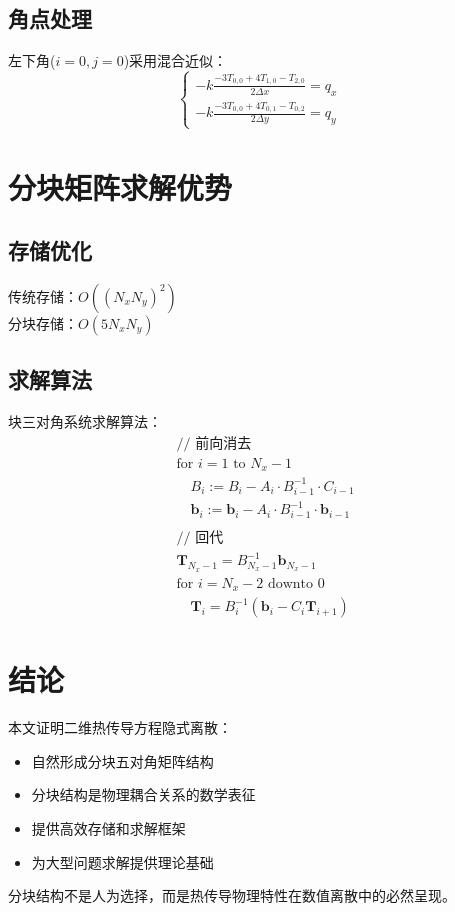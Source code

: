 \documentclass{ctexart}
\begin{document}
\subsection{角点处理}
左下角($i=0,j=0$)采用混合近似：
$$
\begin{cases}
-k \frac{-3T_{0,0} + 4T_{1,0} - T_{2,0}}{2\Delta x} = q_x \\
-k \frac{-3T_{0,0} + 4T_{0,1} - T_{0,2}}{2\Delta y} = q_y
\end{cases}
$$

\section{分块矩阵求解优势}

\subsection{存储优化}
传统存储：$O((N_xN_y)^2)$\\
分块存储：$O(5N_xN_y)$

\subsection{求解算法}
块三对角系统求解算法：
\begin{align*}
&\text{// 前向消去}\\
&\text{for } i = 1 \text{ to } N_x-1 \\
&\quad B_i := B_i - A_i \cdot B_{i-1}^{-1} \cdot C_{i-1} \\
&\quad \mathbf{b}_i := \mathbf{b}_i - A_i \cdot B_{i-1}^{-1} \cdot \mathbf{b}_{i-1} \\
& \\
&\text{// 回代}\\
&\mathbf{T}_{N_x-1} = B_{N_x-1}^{-1} \mathbf{b}_{N_x-1} \\
&\text{for } i = N_x-2 \text{ downto } 0 \\
&\quad \mathbf{T}_i = B_i^{-1} (\mathbf{b}_i - C_i \mathbf{T}_{i+1})
\end{align*}

\section{结论}
本文证明二维热传导方程隐式离散：
\begin{itemize}
\item 自然形成分块五对角矩阵结构
\item 分块结构是物理耦合关系的数学表征
\item 提供高效存储和求解框架
\item 为大型问题求解提供理论基础
\end{itemize}

分块结构不是人为选择，而是热传导物理特性在数值离散中的必然呈现。
\end{document}
